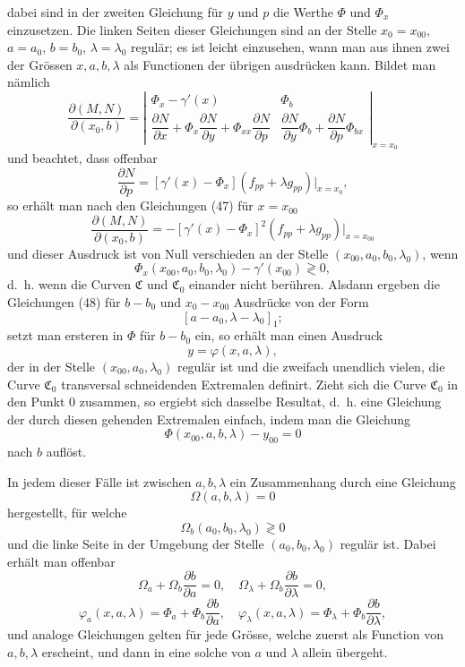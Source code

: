 \documentclass[11pt,a4paper,leqno]{article}
\begin{document}
dabei sind in der zweiten Gleichung für $y$ und $p$ die Werthe $\Phi$ und $\Phi_x$ einzusetzen. Die linken Seiten dieser Gleichungen sind an der Stelle $x_0=x_{00}$, $a=a_0$, $b=b_0$, $\lambda=\lambda_0$ regulär; es ist leicht einzusehen, wann man aus ihnen zwei der Grössen $x,a,b,\lambda$ als Functionen der übrigen ausdrücken kann. Bildet man nämlich
\[
\frac{\partial(M,N)}{\partial(x_0,b)}=
\left|\begin{array}{cc}
\Phi_x-\gamma'(x)&\Phi_b\\[.6ex]
\dfrac{\partial N}{\partial x}+\Phi_x\dfrac{\partial N}{\partial y}+\Phi_{xx}\dfrac{\partial N}{\partial p}&
\dfrac{\partial N}{\partial y}\Phi_b+\dfrac{\partial N}{\partial p}\Phi_{bx}
\end{array}\right|_{x=x_0}
\]
und beachtet, dass offenbar
\[
\frac{\partial N}{\partial p}=[\gamma'(x)-\Phi_x](f_{pp}+\lambda g_{pp})\big|_{x=x_0},
\]
so erhält man nach den Gleichungen (47) für $x=x_{00}$
\[
\frac{\partial(M,N)}{\partial(x_0,b)}=-[\gamma'(x)-\Phi_x]^2(f_{pp}+\lambda g_{pp})\big|_{x=x_{00}}
\]
und dieser Ausdruck ist von Null verschieden an der Stelle $(x_{00},a_0,b_0,\lambda_0)$, wenn
\[
\Phi_x(x_{00},a_0,b_0,\lambda_0)-\gamma'(x_{00})\gtrless 0,
\]
d.~h. wenn die Curven $\mathfrak{C}$ und $\mathfrak{C}_0$ einander nicht berühren. Alsdann ergeben die Gleichungen (48) für $b-b_0$ und $x_0-x_{00}$ Ausdrücke von der Form
\[
[a-a_0,\lambda-\lambda_0]_1;
\]
setzt man ersteren in $\Phi$ für $b-b_0$ ein, so erhält man einen Ausdruck
\begin{equation}\tag{49}
y=\varphi(x,a,\lambda),
\end{equation}
der in der Stelle $(x_{00},a_0,\lambda_0)$ regulär ist und die zweifach unendlich vielen, die Curve $\mathfrak{C}_0$ transversal schneidenden Extremalen definirt. Zieht sich die Curve $\mathfrak{C}_0$ in den Punkt 0 zusammen, so ergiebt sich dasselbe Resultat, d.~h. eine Gleichung der durch diesen gehenden Extremalen einfach, indem man die Gleichung
\begin{equation}\tag{50}
\Phi(x_{00},a,b,\lambda)-y_{00}=0
\end{equation}
nach $b$ auflöst.

In jedem dieser Fälle ist zwischen $a,b,\lambda$ ein Zusammenhang durch eine Gleichung
\begin{equation}\tag{51}
\Omega(a,b,\lambda)=0
\end{equation}
hergestellt, für welche
\begin{equation}\tag{52}
\Omega_b(a_0,b_0,\lambda_0)\gtrless 0
\end{equation}
und die linke Seite in der Umgebung der Stelle $(a_0,b_0,\lambda_0)$ regulär ist. Dabei erhält man offenbar
\[
\Omega_a+\Omega_b\frac{\partial b}{\partial a}=0,
\quad
\Omega_\lambda+\Omega_b\frac{\partial b}{\partial \lambda}=0,
\]
\[
\varphi_a(x,a,\lambda)=\Phi_a+\Phi_b\frac{\partial b}{\partial a},
\quad
\varphi_\lambda(x,a,\lambda)=\Phi_\lambda+\Phi_b\frac{\partial b}{\partial\lambda},
\]
und analoge Gleichungen gelten für jede Grösse, welche zuerst als Function von $a,b,\lambda$ erscheint, und dann in eine solche von $a$ und $\lambda$ allein übergeht.
\end{document}
